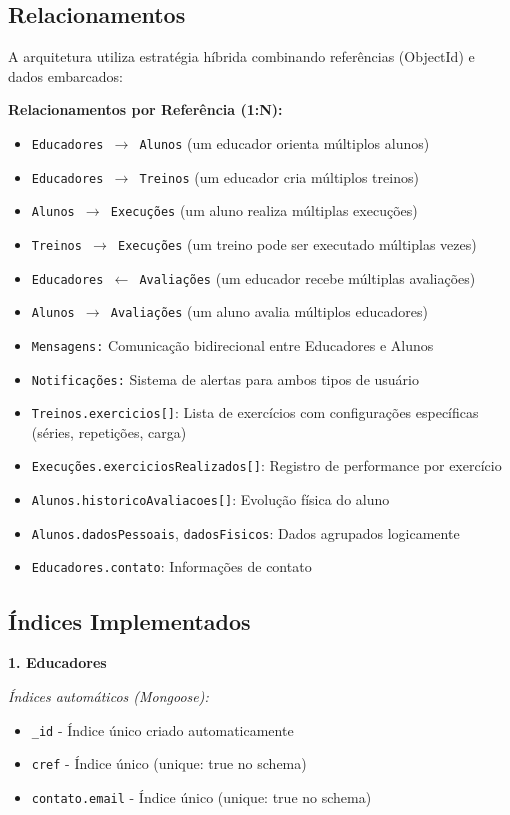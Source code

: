 \documentclass[12pt,a4paper]{article}
\begin{document}
\subsection{Relacionamentos}

A arquitetura utiliza estratégia híbrida combinando referências (ObjectId) e dados embarcados:

\textbf{Relacionamentos por Referência (1:N):}
\begin{itemize}
    \item \texttt{Educadores $\rightarrow$ Alunos} (um educador orienta múltiplos alunos)
    \item \texttt{Educadores $\rightarrow$ Treinos} (um educador cria múltiplos treinos)
    \item \texttt{Alunos $\rightarrow$ Execuções} (um aluno realiza múltiplas execuções)
    \item \texttt{Treinos $\rightarrow$ Execuções} (um treino pode ser executado múltiplas vezes)
    \item \texttt{Educadores $\leftarrow$ Avaliações} (um educador recebe múltiplas avaliações)
    \item \texttt{Alunos $\rightarrow$ Avaliações} (um aluno avalia múltiplos educadores)
    \item \texttt{Mensagens:} Comunicação bidirecional entre Educadores e Alunos
    \item \texttt{Notificações:} Sistema de alertas para ambos tipos de usuário
    \item \texttt{Treinos.exercicios[]}: Lista de exercícios com configurações específicas (séries, repetições, carga)
    \item \texttt{Execuções.exerciciosRealizados[]}: Registro de performance por exercício
    \item \texttt{Alunos.historicoAvaliacoes[]}: Evolução física do aluno
    \item \texttt{Alunos.dadosPessoais}, \texttt{dadosFisicos}: Dados agrupados logicamente
    \item \texttt{Educadores.contato}: Informações de contato
\end{itemize}

\subsection{Índices Implementados}

\textbf{1. Educadores}

\textit{Índices automáticos (Mongoose):}
\begin{itemize}
    \item \texttt{\_id} - Índice único criado automaticamente
    \item \texttt{cref} - Índice único (unique: true no schema)
    \item \texttt{contato.email} - Índice único (unique: true no schema)
\end{itemize}
\end{document}
